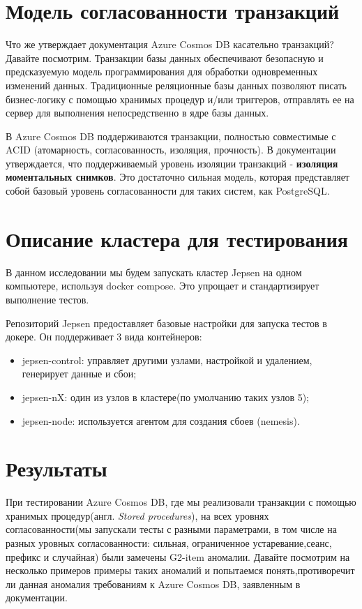 \documentclass[12pt,  openany]{book}
\begin{document}
\section{Модель согласованности транзакций}
Что же утверждает документация Azure Cosmos DB касательно транзакций? Давайте посмотрим.
Транзакции базы данных обеспечивают безопасную и предсказуемую модель программирования для обработки одновременных изменений данных. Традиционные реляционные базы данных позволяют писать бизнес-логику с помощью хранимых процедур и/или триггеров, отправлять ее на сервер для выполнения непосредственно в ядре базы данных. 
\par
В Azure Cosmos DB поддерживаются транзакции, полностью совместимые с ACID (атомарность, согласованность, изоляция, прочность). В документации утверждается, что поддерживаемый уровень изоляции транзакций - \textbf{изоляция моментальных снимков}.  Это достаточно сильная модель, которая представляет собой базовый уровень согласованности для таких систем, как PostgreSQL. 

\section{Описание кластера для тестирования}
В данном исследовании мы будем запускать кластер Jepsen на одном компьютере, используя docker compose.  Это упрощает и стандартизирует выполнение тестов. 
\par Репозиторий Jepsen предоставляет базовые настройки для запуска тестов в докере. Он поддерживает 3 вида контейнеров:  
\begin{itemize}
\item jepsen-control:  управляет другими узлами, настройкой и удалением, генерирует данные и сбои;
\item jepsen-nX:  один из узлов в кластере(по умолчанию таких узлов 5);
\item jepsen-node: используется агентом для создания сбоев (nemesis). 
\end{itemize}

\section{Результаты}
При тестировании Azure Cosmos DB, где мы реализовали транзакции с помощью хранимых процедур(англ. \textit{Stored procedures}), на всех уровнях согласованности(мы запускали тесты с разными параметрами, в том числе на разных уровных согласованности: сильная, ограниченное устаревание,сеанс, префикс и случайная) были замечены G2-item  аномалии. Давайте посмотрим на несколько примеров примеры таких аномалий и попытаемся понять,противоречит ли данная аномалия требованиям к Azure Cosmos DB, заявленным в документации.
\end{document}
